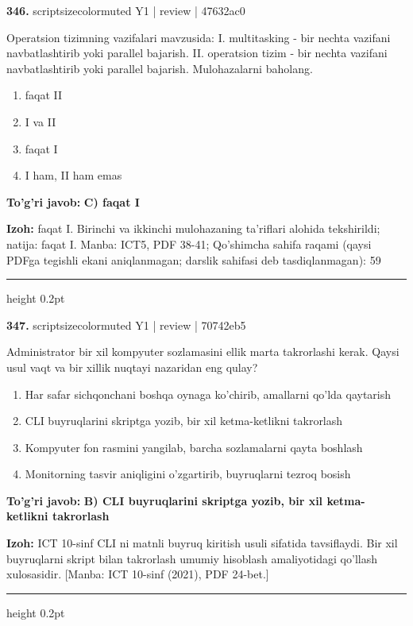 \documentclass[10pt,a4paper]{article}
\begin{document}
{\bfseries\sffamily\color{ink} 346.} {scriptsizecolor{muted} Y1 | review | 47632ac0}
\par
Operatsion tizimning vazifalari mavzusida: I. multitasking - bir nechta vazifani navbatlashtirib yoki parallel bajarish. II. operatsion tizim - bir nechta vazifani navbatlashtirib yoki parallel bajarish. Mulohazalarni baholang.
\begin{enumerate}[label=\Alph*),leftmargin=9mm]
\item faqat II
\item I va II
\item faqat I
\item I ham, II ham emas
\end{enumerate}
\begin{tcolorbox}[enhanced,breakable,colback=teal!4,colframe=teal!60!black,boxrule=0.45pt,arc=1.2mm,left=2.7mm,right=2.7mm,top=1.8mm,bottom=1.8mm,before skip=2mm,after skip=2mm]
{\bfseries\sffamily\color{teal}To'g'ri javob:} \textbf{C) faqat I}
\par\smallskip
{\bfseries Izoh:} faqat I. Birinchi va ikkinchi mulohazaning ta'riflari alohida tekshirildi; natija: faqat I. Manba: ICT5, PDF 38-41; Qo'shimcha sahifa raqami (qaysi PDFga tegishli ekani aniqlanmagan; darslik sahifasi deb tasdiqlanmagan): 59
\end{tcolorbox}
\vspace{2mm}\hrule height 0.2pt\vspace{3mm}

{\bfseries\sffamily\color{ink} 347.} {scriptsizecolor{muted} Y1 | review | 70742eb5}
\par
Administrator bir xil kompyuter sozlamasini ellik marta takrorlashi kerak. Qaysi usul vaqt va bir xillik nuqtayi nazaridan eng qulay?
\begin{enumerate}[label=\Alph*),leftmargin=9mm]
\item Har safar sichqonchani boshqa oynaga ko'chirib, amallarni qo'lda qaytarish
\item CLI buyruqlarini skriptga yozib, bir xil ketma-ketlikni takrorlash
\item Kompyuter fon rasmini yangilab, barcha sozlamalarni qayta boshlash
\item Monitorning tasvir aniqligini o'zgartirib, buyruqlarni tezroq bosish
\end{enumerate}
\begin{tcolorbox}[enhanced,breakable,colback=teal!4,colframe=teal!60!black,boxrule=0.45pt,arc=1.2mm,left=2.7mm,right=2.7mm,top=1.8mm,bottom=1.8mm,before skip=2mm,after skip=2mm]
{\bfseries\sffamily\color{teal}To'g'ri javob:} \textbf{B) CLI buyruqlarini skriptga yozib, bir xil ketma-ketlikni takrorlash}
\par\smallskip
{\bfseries Izoh:} ICT 10-sinf CLI ni matnli buyruq kiritish usuli sifatida tavsiflaydi. Bir xil buyruqlarni skript bilan takrorlash umumiy hisoblash amaliyotidagi qo'llash xulosasidir. [Manba: ICT 10-sinf (2021), PDF 24-bet.]
\end{tcolorbox}
\vspace{2mm}\hrule height 0.2pt\vspace{3mm}
\end{document}
